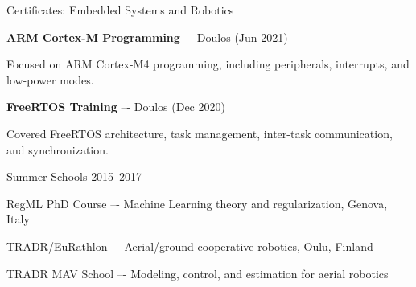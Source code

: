 
\begin{cventries}

  \cventry
  {Certificates: Embedded Systems and Robotics} %
  {} %
  {} %
  {} %
  {
    \begin{cvitems}
    \item {\textbf{ARM Cortex-M Programming} –- Doulos (Jun 2021)}
      \begin{cvparagraph}
        Focused on ARM Cortex-M4 programming, including peripherals, interrupts, and low-power modes.
      \end{cvparagraph}
    \item {\textbf{FreeRTOS Training} –- Doulos (Dec 2020)}
      \begin{cvparagraph}
        Covered FreeRTOS architecture, task management, inter-task communication, and synchronization.
      \end{cvparagraph}
    \end{cvitems}
  }

  \cventry
  {Summer Schools} %
  {} %
  {} %
  {2015--2017} %
  {
    \begin{cvitems}
    \item {RegML PhD Course –- Machine Learning theory and regularization, Genova, Italy}
    \item {TRADR/EuRathlon –- Aerial/ground cooperative robotics, Oulu, Finland}
    \item {TRADR MAV School –- Modeling, control, and estimation for aerial robotics}
    \end{cvitems}
  }

\end{cventries}
